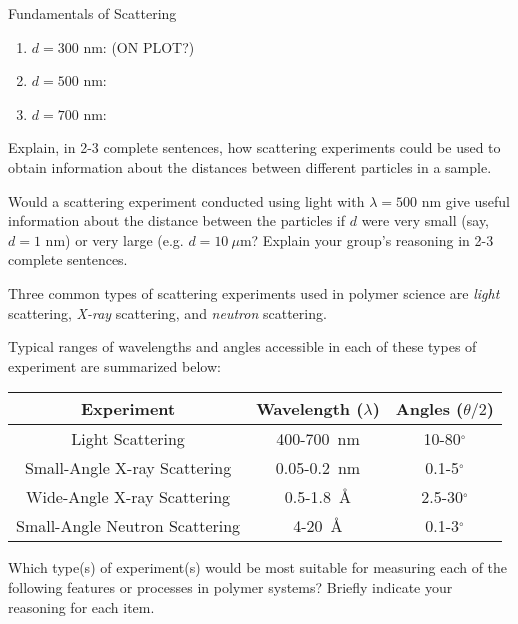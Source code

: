 \begin{activity}{Fundamentals of Scattering}
\begin{ctqs}
		\begin{enumerate}
			\item $d=300\text{ nm}$: (ON PLOT?)
			\item $d=500\text{ nm}$:
			\item $d=700\text{ nm}$:
		\end{enumerate}
		
	\question Explain, in 2-3 complete sentences, how scattering experiments could be used to obtain information about the distances between different particles in a sample.
	
	\question Would a scattering experiment conducted using light with $\lambda=500\text{ nm}$ give useful information about the distance between the particles if $d$ were very small (say, $d=1\text{ nm}$) or very large (e.g. $d=10~\mu\text{m}$?  Explain your group's reasoning in 2-3 complete sentences.
	
\end{ctqs}


\begin{infobox}%

	Three common types of scattering experiments used in polymer science are \emph{light} scattering, \emph{X-ray} scattering, and \emph{neutron} scattering.
	
	Typical ranges of wavelengths and angles accessible in each of these types of experiment are summarized below:
	
	\begin{center}
	\renewcommand{\arraystretch}{1.3}
	\begin{tabular}{ccc}
		\hline
		\textbf{Experiment} & \textbf{Wavelength ($\lambda$)} & \textbf{Angles ($\theta/2$)}\\\hline
		Light Scattering & 400-700~nm & 10-80${}^\circ$ \\
		Small-Angle X-ray Scattering & 0.05-0.2~nm & 0.1-5${}^\circ$\\ 
		Wide-Angle X-ray Scattering & 0.5-1.8~\AA & 2.5-30${}^\circ$\\
		Small-Angle Neutron Scattering & 4-20~\AA & 0.1-3${}^\circ$\\\hline
	\end{tabular}
	\end{center}

\end{infobox}

\begin{ctqs}

	\question Which type(s) of experiment(s) would be most suitable for measuring each of the following features or processes in polymer systems?  Briefly indicate your reasoning for each item.
	

\end{ctqs}
\end{activity}
